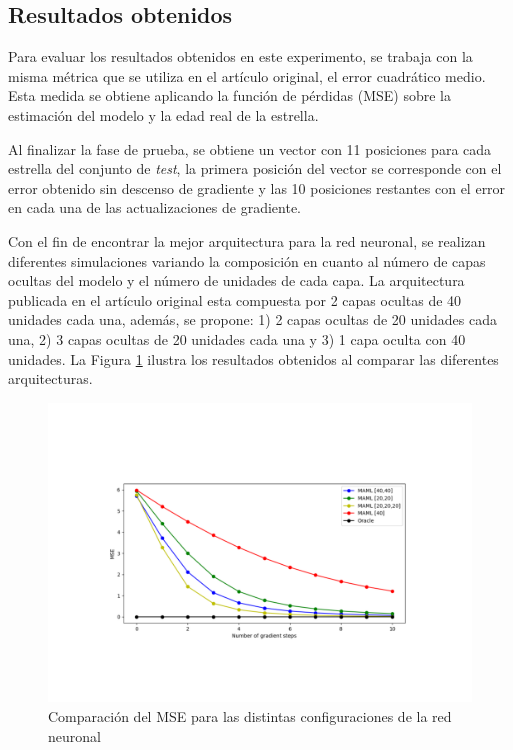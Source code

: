 \subsection{Resultados obtenidos} 
\label{sub:maml_result}
Para evaluar los resultados obtenidos en este experimento, se trabaja con la misma métrica que se utiliza en el artículo original, el error cuadrático medio. Esta medida se obtiene aplicando la función de pérdidas (MSE) sobre la estimación del modelo y la edad real de la estrella. 

Al finalizar la fase de prueba, se obtiene un vector con 11 posiciones para cada estrella del conjunto de \emph{test}, la primera posición del vector se corresponde con el error obtenido sin descenso de gradiente y las 10 posiciones restantes con el error en cada una de las actualizaciones de gradiente.


Con el fin de encontrar la mejor arquitectura para la red neuronal, se realizan diferentes simulaciones variando la composición en cuanto al número de capas ocultas del modelo y el número de unidades de cada capa. La arquitectura publicada en el artículo original esta compuesta por 2 capas ocultas de 40 unidades cada una, además, se propone: 1) 2 capas ocultas de 20 unidades cada una, 2) 3 capas ocultas de 20 unidades cada una y 3) 1 capa oculta con 40 unidades.
La Figura \ref{fig:mse_nnet} ilustra los resultados obtenidos al comparar las diferentes arquitecturas.

\begin{figure}[H]
\begin{center}
 \includegraphics[width=0.8\linewidth]{Figuras/MAML/MSE.pdf}
\end{center}
\caption{Comparación del MSE para las distintas configuraciones de la red neuronal}
 \label{fig:mse_nnet}
\end{figure}

